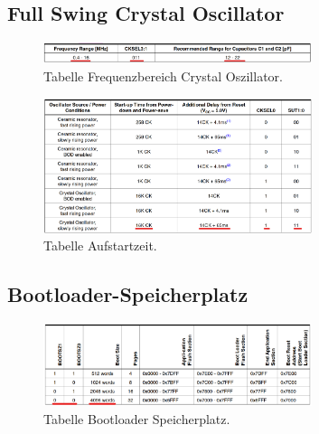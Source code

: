 \begin{appendix}

\subsection{Full Swing Crystal Oscillator}\label{Appendix:Full_Swing _Crystal_Oscillator}

\begin{figure}[h!]
	\centering
	\includegraphics[width=0.7\textwidth]{graphics/Tabelle_Crystal}
	\caption{Tabelle Frequenzbereich Crystal Oszillator.}
	\label{fig:Tabelle_Crystal}
\end{figure}


\begin{figure}[h!]
	\centering
	\includegraphics[width=0.7\textwidth]{graphics/Tabelle_Crystal2}
	\caption{Tabelle Aufstartzeit.}
	\label{fig:Tabelle_Crystal2}
\end{figure}


\subsection{Bootloader-Speicherplatz}\label{Appendix:Bootloader-Speicherplatz}

\begin{figure}[h!]
	\centering
	\includegraphics[width=0.7\textwidth]{graphics/Tabelle_Bootloader}
	\caption{Tabelle Bootloader Speicherplatz.}
	\label{fig:Tabelle_Bootloader}
\end{figure}


\end{appendix}
